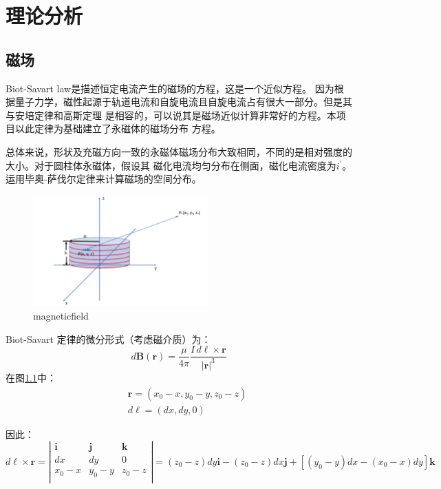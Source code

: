 \documentclass[AutoFakeBold]{LZUThesis}
\begin{document}
\chapter{理论分析}
\section{磁场}
Biot-Savart law\cite{Biot_Savart_Law}是描述恒定电流产生的磁场的方程，这是一个近似方程。
因为根据量子力学，磁性起源于轨道电流和自旋电流且自旋电流占有很大一部分。但是其与安培定律和高斯定理
是相容的，可以说其是磁场近似计算非常好的方程。本项目以此定律为基础建立了永磁体的磁场分布
方程。

总体来说，形状及充磁方向一致的永磁体磁场分布大致相同，不同的是相对强度的大小。对于圆柱体永磁体，假设其
磁化电流均匀分布在侧面，磁化电流密度为$i^{'}$。运用毕奥-萨伐尔定律来计算磁场的空间分布。
\begin{figure}[H]
    \centering
    \includegraphics[width=0.6\textwidth]{figures/magneticfield.png}
    \caption{magneticfield}
    \label{magneticfield}
\end{figure}
Biot-Savart 定律的微分形式（考虑磁介质）为：
\begin{equation}
    d\mathbf {B} (\mathbf {r} )={\frac {\mu}{4\pi }}{\frac {I\,d{\boldsymbol {\ell }}\times \mathbf {r} }{|\mathbf {r} |^{3}}}
\end{equation}
在图\ref{magneticfield}中：
\begin{equation}
    \begin{aligned}
        & \quad \mathbf{r} = (x_0 - x, y_0 - y, z_0 - z)\\
        & \quad d\boldsymbol {\ell } = (dx, dy, 0)
    \end{aligned}
\end{equation}

因此：
\begin{equation}
    d\boldsymbol {\ell } \times \mathbf{r} = \left | \begin{matrix}
    \mathbf{i} &\mathbf{j}   &\mathbf{k} \\
    dx &dy &0  \\
    x_0 - x & y_0 - y &z_0 - z \\
    \end{matrix} \right |  = (z_0 - z)dy\mathbf{i} - (z_0 - z)dx\mathbf{j} + 
    [(y_0 - y)dx - (x_0 - x)dy]\mathbf{k}
\end{equation}
\end{document}
